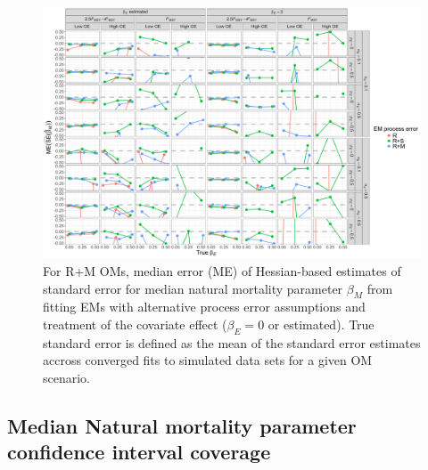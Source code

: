\documentclass[
  12pt,
]{article}
\begin{document}
\begin{landscape}
\begin{figure}
\begin{center}
\includegraphics[height = \textheight]{se_beta_M_bias_RMom}
\end{center}
\caption{For R+M OMs, median error (ME) of Hessian-based estimates of standard error for median natural mortality parameter $\beta_M$ from fitting EMs with alternative process error assumptions and treatment of the covariate effect ($\beta_ E= 0$ or estimated). True standard error is defined as the mean of the standard error estimates accross converged fits to simulated data sets for a given OM scenario.}\label{se_beta_M_bias_RMom}
\end{figure}
\end{landscape}

\hypertarget{median-natural-mortality-parameter-confidence-interval-coverage}{%
\subsection*{Median Natural mortality parameter confidence interval coverage}\label{median-natural-mortality-parameter-confidence-interval-coverage}}
\end{document}
